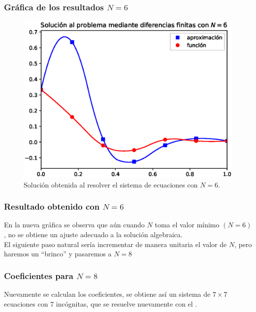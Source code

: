 \begin{frame}
\frametitle{Gráfica de los resultados $N=6$}
\begin{figure}[h!]
    \centering
    \includegraphics[scale=0.5]{Imagenes/metodo_diferencias_finitas_03.eps}
    \caption{Solución obtenida al resolver el sistema de ecuaciones con $N=6$.}
\end{figure}
\end{frame}
\begin{frame}
\frametitle{Resultado obtenido con $N=6$}
En la nueva gráfica se observa que aún cuando $N$ toma el valor mínimo $(N = 6)$, no se obtiene un ajuste adecuado a la solución algebraica.
\\
\bigskip
El siguiente paso natural sería incrementar de manera unitaria el valor de $N$, pero haremos un \enquote{brinco} y pasaremos a $N=8$
\end{frame}
\begin{frame}
\frametitle{Coeficientes para $N=8$}
Nuevamente se calculan los coeficientes, se obtiene así un sistema de $7 \times 7$ ecuaciones con $7$ incógnitas, que se resuelve nuevamente con el .
\end{frame}
